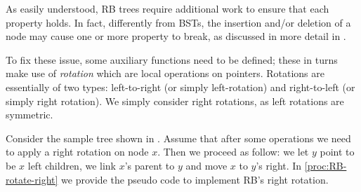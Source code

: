 \documentclass{subfiles}
\begin{document}
\label{sec:RB-rotations}
    As easily understood, RB trees require additional work to ensure that each property holds.
        In fact, differently from BSTs, the insertion and/or deletion of a node may cause 
        one or more property to break, as discussed in more detail in .

    To fix these issue, some auxiliary functions need to be defined;
        these in turns make use of \emph{rotation} which are local operations on pointers.
        Rotations are essentially of two types: left-to-right (or simply left-rotation) and 
        right-to-left (or simply right rotation).
        We simply consider right rotations, as left rotations are symmetric. 

    Consider the sample tree shown in . 
        Assume that after some operations we need to apply a right rotation on node \(x\).
        Then we proceed as follow: we let \(y\) point to be \(x\) left children, 
        we link \(x\)'s parent to \(y\) and move \(x\) to \(y\)'s right.
        In \autoref{proc:RB-rotate-right} we provide the pseudo code to implement RB's right rotation.

    
    
\end{document}
